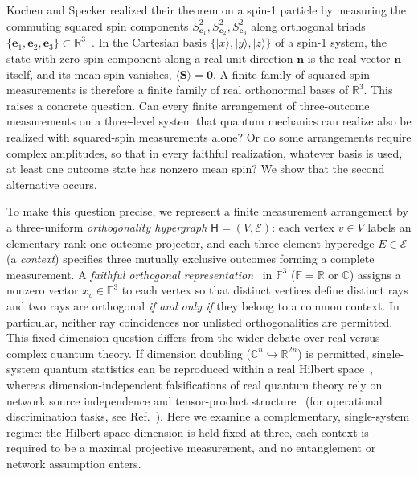 \documentclass[twocolumn,aps,pra,floatfix,amsmath,amssymb,longbibliography]{revtex4-2}
\newenvironment{handrewrite}{\leavevmode\color{blue}}{}
\theoremstyle{definition}
\theoremstyle{remark}
\newcommand{\C}{\mathbb C}
\newcommand{\R}{\mathbb R}
\begin{document}
\begin{handrewrite}
Kochen and Specker realized their theorem on a spin-1 particle by measuring the commuting squared spin components $S_{\mathbf e_1}^2, S_{\mathbf e_2}^2, S_{\mathbf e_3}^2$ along orthogonal triads $\{\mathbf e_1,\mathbf e_2,\mathbf e_3\}\subset\R^3$~\cite{kochen1}.  In the Cartesian basis $\{|x\rangle,|y\rangle,|z\rangle\}$ of a spin-1 system, the state with zero spin component along a real unit direction $\mathbf n$ is the real vector $\mathbf n$ itself, and its mean spin vanishes, $\langle\mathbf S\rangle=\mathbf 0$.  A finite family of squared-spin measurements is therefore a finite family of real orthonormal bases of $\R^3$.  This raises a concrete question.  Can every finite arrangement of three-outcome measurements on a three-level system that quantum mechanics can realize also be realized with squared-spin measurements alone?  Or do some arrangements require complex amplitudes, so that in every faithful realization, whatever basis is used, at least one outcome state has nonzero mean spin?  We show that the second alternative occurs.

To make this question precise, we represent a finite measurement arrangement by a three-uniform \emph{orthogonality hypergraph} $\mathsf H=(V,\mathcal E)$: each vertex $v\in V$ labels an elementary rank-one outcome projector, and each three-element hyperedge $E\in\mathcal E$ (a \emph{context}) specifies three mutually exclusive outcomes forming a complete measurement.  A \emph{faithful orthogonal representation}~\cite{lovasz-79,Portillo-2015} in $\mathbb F^3$ ($\mathbb F=\R$ or $\C$) assigns a nonzero vector $x_v\in\mathbb F^3$ to each vertex so that distinct vertices define distinct rays and two rays are orthogonal \emph{if and only if} they belong to a common context.  In particular, neither ray coincidences nor unlisted orthogonalities are permitted.  This fixed-dimension question differs from the wider debate over real versus complex quantum theory.  If dimension doubling ($\C^n\hookrightarrow\R^{2n}$) is permitted, single-system quantum statistics can be reproduced within a real Hilbert space~\cite{McKague2009SimulatingRealHilbert,Hardy2012LimitedHolism,Aleksandrova2013UniversalQubit}, whereas dimension-independent falsifications of real quantum theory rely on network source independence and tensor-product structure~\cite{renou-2021,Weilenmann2025PartialIndependencePRL} (for operational discrimination tasks, see Ref.~\cite{Bednorz2022OptimalDiscrimination}).  Here we examine a complementary, single-system regime: the Hilbert-space dimension is held fixed at three, each context is required to be a maximal projective measurement, and no entanglement or network assumption enters.


\end{handrewrite}
\end{document}

